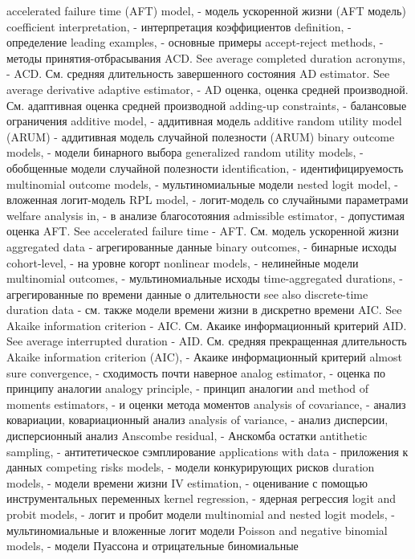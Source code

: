 accelerated failure time (AFT) model, - модель ускоренной жизни (AFT модель)
coefficient interpretation, - интерпретация коэффициентов
definition, - определение
leading examples, - основные примеры
accept-reject methods, - методы принятия-отбрасывания
ACD. See average completed duration acronyms, - ACD. См. средняя длительность завершенного состояния
AD estimator. See average derivative adaptive estimator, - AD оценка, оценка средней производной. См. адаптивная оценка средней производной
adding-up constraints, - балансовые ограничения
additive model, - аддитивная модель
additive random utility model (ARUM) - аддитивная модель случайной полезности (ARUM)
binary outcome models, - модели бинарного выбора
generalized random utility models, - обобщенные модели случайной полезности
identification, - идентифицируемость
multinomial outcome models, - мультиномиальные модели
nested logit model, - вложенная логит-модель
RPL model, - логит-модель со случайными параметрами
welfare analysis in, - в анализе благосотояния
admissible estimator, - допустимая оценка
AFT. See accelerated failure time - AFT. См. модель ускоренной жизни
aggregated data - агрегированные данные
binary outcomes, - бинарные исходы
cohort-level, - на уровне когорт
nonlinear models, - нелинейные модели
multinomial outcomes, - мультиномиальные исходы
time-aggregated durations, - агрегированные по времени данные о длительности
see also discrete-time duration data - см. также модели времени жизни в дискретно времени
AIC. See Akaike information criterion - AIC. См. Акаике информационный критерий
AID. See average interrupted duration - AID. См. средняя прекращенная длительность
Akaike information criterion (AIC), - Акаике информационный критерий
almost sure convergence, - сходимость почти наверное
analog estimator, - оценка по принципу аналогии
analogy principle, - принцип аналогии
and method of moments estimators, - и оценки метода моментов
analysis of covariance, - анализ ковариации, ковариационный анализ
analysis of variance, - анализ дисперсии, дисперсионный анализ
Anscombe residual, - Анскомба остатки
antithetic sampling, - антитетическое сэмплирование
applications with data - приложения к данных
competing risks models, - модели конкурирующих рисков
duration models, - модели времени жизни
IV estimation, - оценивание с помощью инструментальных переменных
kernel regression, - ядерная регрессия
logit and probit models, - логит и пробит модели
multinomial and nested logit models, - мультиномиальные и вложенные логит модели
Poisson and negative binomial models, - модели Пуассона и отрицательные биномиальные
